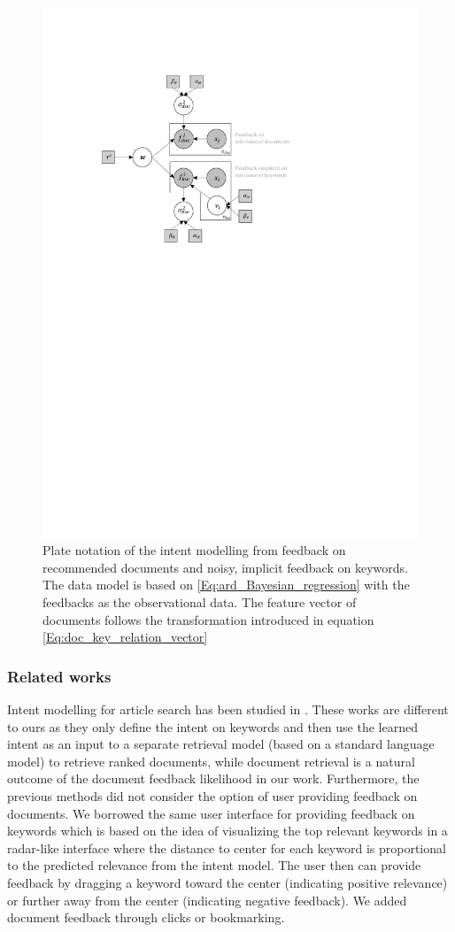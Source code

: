 \documentclass[dissertation,math,vertlayout,pdfa,colorlinks]{aaltoseries}
\begin{document}
\begin{figure}
	\centering
	\includegraphics[width=0.80\linewidth]{Figures/Plate_diagram_intent_imp.pdf}
	\caption{Plate notation of the intent modelling from feedback on recommended documents and noisy, implicit feedback on keywords. The data model is based on \ref{Eq:ard_Bayesian_regression} with the feedbacks as the observational data. The feature vector of documents follows the transformation introduced in equation \ref{Eq:doc_key_relation_vector}}
	\label{fig:Plate_intent_imp}
\end{figure}

   
\subsubsection{Related works}
Intent modelling for article search has been studied in  \cite{GlowIUI2013,ruotsalo2015interactive,Ruotsalo2018}. These works are different to ours as they only define the intent on keywords and then use the learned intent as an input to a separate retrieval model (based on a standard language model) to retrieve ranked documents, while document retrieval is a natural outcome of the document feedback likelihood in our work. Furthermore, the previous methods did not consider the option of user providing feedback on documents. We borrowed the same user interface for providing feedback on keywords which is based on the idea of visualizing the top relevant keywords in a radar-like interface where the distance to center for each keyword is proportional to the predicted relevance from the intent model. The user then can provide feedback by dragging a keyword toward the center (indicating positive relevance) or further away from the center (indicating negative feedback). We added document feedback through clicks or bookmarking. 
\end{document}
